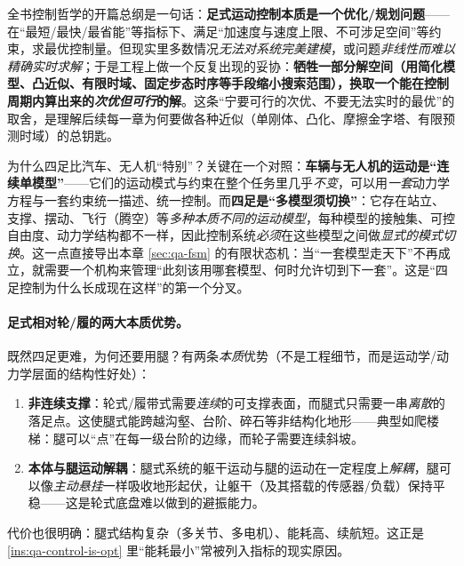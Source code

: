 \begin{insight}[控制 $=$ 优化/规划，难解时牺牲解空间换可行解（全章总纲）]\label{ins:qa-control-is-opt}
全书控制哲学的开篇总纲是一句话：\textbf{足式运动控制本质是一个优化/规划问题}——在“最短/最快/最省能”等指标下、满足“加速度与速度上限、不可涉足空间”等约束，求最优控制量。但现实里多数情况\emph{无法对系统完美建模}，或问题\emph{非线性而难以精确实时求解}；于是工程上做一个反复出现的妥协：\textbf{牺牲一部分解空间（用简化模型、凸近似、有限时域、固定步态时序等手段缩小搜索范围），换取一个能在控制周期内算出来的\emph{次优但可行}的解}。这条“宁要可行的次优、不要无法实时的最优”的取舍，是理解后续每一章为何要做各种近似（单刚体、凸化、摩擦金字塔、有限预测时域）的总钥匙。
\end{insight}

\begin{insight}\label{ins:qa-multimodel}
为什么四足比汽车、无人机“特别”？关键在一个对照：\textbf{车辆与无人机的运动是“连续单模型”}——它们的运动模式与约束在整个任务里几乎\emph{不变}，可以用\emph{一套}动力学方程与一套约束统一描述、统一控制。而\textbf{四足是“多模型须切换”}：它存在站立、支撑、摆动、飞行（腾空）等\emph{多种本质不同的运动模型}，每种模型的接触集、可控自由度、动力学结构都不一样，因此控制系统\emph{必须}在这些模型之间做\emph{显式的模式切换}。这一点直接导出本章 \cref{sec:qa-fsm} 的有限状态机：当“一套模型走天下”不再成立，就需要一个机构来管理“此刻该用哪套模型、何时允许切到下一套”。这是“四足控制为什么长成现在这样”的第一个分叉。
\end{insight}

\paragraph{足式相对轮/履的两大本质优势。}
既然四足更难，为何还要用腿？有两条\emph{本质}优势（不是工程细节，而是运动学/动力学层面的结构性好处）：
\begin{enumerate}
  \item \textbf{非连续支撑}：轮式/履带式需要\emph{连续}的可支撑表面，而腿式只需要一串\emph{离散}的落足点。这使腿式能跨越沟壑、台阶、碎石等非结构化地形——典型如爬楼梯：腿可以“点”在每一级台阶的边缘，而轮子需要连续斜坡\cite{yu2021quadruped}。
  \item \textbf{本体与腿运动解耦}：腿式系统的躯干运动与腿的运动在一定程度上\emph{解耦}，腿可以像\emph{主动悬挂}一样吸收地形起伏，让躯干（及其搭载的传感器/负载）保持平稳——这是轮式底盘难以做到的避振能力\cite{yu2021quadruped}。
\end{enumerate}
代价也很明确：腿式结构复杂（多关节、多电机）、能耗高、续航短\cite{yu2021quadruped}。这正是 \cref{ins:qa-control-is-opt} 里“能耗最小”常被列入指标的现实原因。


